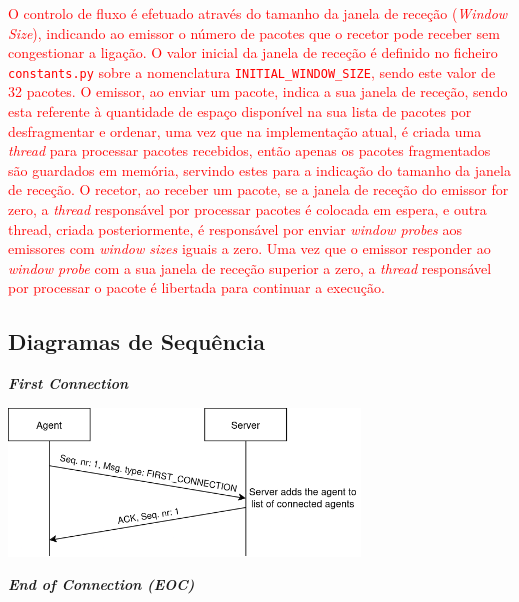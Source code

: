 \documentclass[a4paper,12pt]{scrreprt}
\begin{document}
\textcolor{red}{
    O controlo de fluxo é efetuado através do tamanho da janela de receção (\textit{Window Size}),
    indicando ao emissor o número de pacotes que o recetor pode receber sem congestionar a ligação.
    O valor inicial da janela de receção é definido no ficheiro \texttt{constants.py} sobre a nomenclatura
    \texttt{INITIAL\_WINDOW\_SIZE}, sendo este valor de 32 pacotes. O emissor, ao enviar um pacote, indica
    a sua janela de receção, sendo esta referente à quantidade de espaço disponível na sua lista de pacotes
    por desfragmentar e ordenar, uma vez que na implementação atual, é criada uma \textit{thread} para processar
    pacotes recebidos, então apenas os pacotes fragmentados são guardados em memória, servindo estes para a indicação
    do tamanho da janela de receção.
    O recetor, ao receber um pacote, se a janela de receção do emissor for zero,
    a \textit{thread} responsável por processar pacotes é colocada em espera,
    e outra thread, criada posteriormente, é responsável por enviar \textit{window probes}
    aos emissores com \textit{window sizes} iguais a zero. Uma vez que o emissor
    responder ao \textit{window probe} com a sua janela de receção superior a zero,
    a \textit{thread} responsável por processar o pacote é libertada para continuar
    a execução.
}

\subsection{Diagramas de Sequência}

\textbf{\textit{First Connection}}

\begin{minipage}{\textwidth}
    \centering
    \includegraphics[width=0.7\textwidth]{img/sequence_diagrams/first_connection.png}
    \label{fig:nt_first_connection}
\end{minipage}

\vspace{1cm}

\textbf{\textit{End of Connection (EOC)}}
\end{document}
